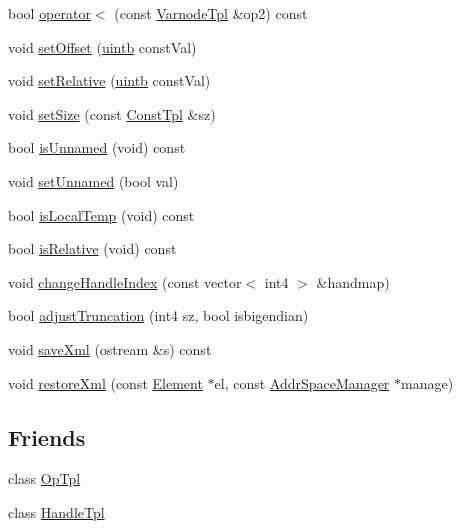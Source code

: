 \begin{DoxyCompactItemize}
\item 
bool \mbox{\hyperlink{class_varnode_tpl_a3254e33a5648c3e580419af7e77340ed}{operator$<$}} (const \mbox{\hyperlink{class_varnode_tpl}{Varnode\+Tpl}} \&op2) const
\item 
void \mbox{\hyperlink{class_varnode_tpl_ad1fec1f52f255bad6d19f6e071ef9742}{set\+Offset}} (\mbox{\hyperlink{types_8h_a2db313c5d32a12b01d26ac9b3bca178f}{uintb}} const\+Val)
\item 
void \mbox{\hyperlink{class_varnode_tpl_a3bd0bf265d8ea0d8465b3d366b5e399c}{set\+Relative}} (\mbox{\hyperlink{types_8h_a2db313c5d32a12b01d26ac9b3bca178f}{uintb}} const\+Val)
\item 
void \mbox{\hyperlink{class_varnode_tpl_a83320b75a364cdc5c335df6bb5595b30}{set\+Size}} (const \mbox{\hyperlink{class_const_tpl}{Const\+Tpl}} \&sz)
\item 
bool \mbox{\hyperlink{class_varnode_tpl_a0c5a2963be70cc43f2b75d75413b000d}{is\+Unnamed}} (void) const
\item 
void \mbox{\hyperlink{class_varnode_tpl_a29e83b9bc3e299e73ec67f3ae3f76e70}{set\+Unnamed}} (bool val)
\item 
bool \mbox{\hyperlink{class_varnode_tpl_a8f21f8da0ea1eae3995b90787849b592}{is\+Local\+Temp}} (void) const
\item 
bool \mbox{\hyperlink{class_varnode_tpl_acc2762c411899ba3a7801566aebdcbef}{is\+Relative}} (void) const
\item 
void \mbox{\hyperlink{class_varnode_tpl_a2cd82b00a027189ff761b0d6db930ea6}{change\+Handle\+Index}} (const vector$<$ int4 $>$ \&handmap)
\item 
bool \mbox{\hyperlink{class_varnode_tpl_a667fba2ee7a49e3ef4ba3b82e4200048}{adjust\+Truncation}} (int4 sz, bool isbigendian)
\item 
void \mbox{\hyperlink{class_varnode_tpl_a04f5e3155274e1edf51585d8cd09183c}{save\+Xml}} (ostream \&s) const
\item 
void \mbox{\hyperlink{class_varnode_tpl_a66657e67cb1b92bd59ff3a5c00b6daf8}{restore\+Xml}} (const \mbox{\hyperlink{class_element}{Element}} $\ast$el, const \mbox{\hyperlink{class_addr_space_manager}{Addr\+Space\+Manager}} $\ast$manage)
\end{DoxyCompactItemize}
\subsection*{Friends}
\begin{DoxyCompactItemize}
\item 
class \mbox{\hyperlink{class_varnode_tpl_a025636ce30ef2482bde0e65990ce710e}{Op\+Tpl}}
\item 
class \mbox{\hyperlink{class_varnode_tpl_a47ccc5db4f81caa67fccdc5c8ee95d56}{Handle\+Tpl}}
\end{DoxyCompactItemize}


